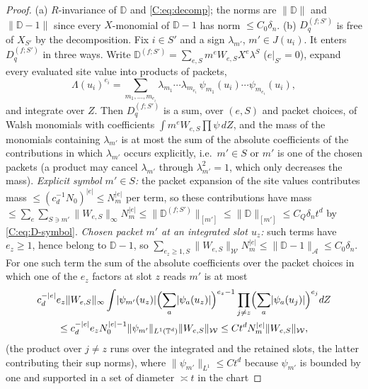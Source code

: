 \documentclass[11pt]{article}
\newcommand{\Torus}{\mathbb{T}}
\newcommand{\cW}{\mathcal{W}}
\newcommand{\cA}{\mathcal{A}}
\newcommand{\norm}[1]{\lVert #1\rVert}
\newcommand{\abs}[1]{\lvert #1\rvert}
\begin{document}
\begin{proof}
(a) \(R\)-invariance of \(\mathbb D\) and \eqref{C:eq:decomp}; the norms are
\(\norm{\mathbb D}\) and \(\norm{\mathbb D-1}\) since every \(X\)-monomial of
\(\mathbb D-1\) has norm \(\le C_0\delta_n\).  (b) \(D_q^{(f;S')}\) is free of \(X_{S'}\) by the decomposition.  Fix
\(i\in S'\) and a sign \(\lambda_{m'}\), \(m'\in J(u_i)\).  It enters
\(D_q^{(f;S')}\) in three ways.  Write
\(\mathbb D^{(f;S')}=\sum_{e,S}m^eW_{e,S}X^e\lambda^S\) (\(e|_{S'}=0\)), expand
every evaluated site value into products of packets,
\[
 \Lambda(u_i)^{e_i}=\sum_{m_1,\dots,m_{e_i}}\lambda_{m_1}\cdots\lambda_{m_{e_i}}\,\psi_{m_1}(u_i)\cdots\psi_{m_{e_i}}(u_i),
\]
and integrate over \(Z\).  Then \(D_q^{(f;S')}\) is a sum, over \((e,S)\) and
packet choices, of Walsh monomials with coefficients
\(\int m^eW_{e,S}\prod\psi\,dZ\), and the mass of the monomials containing
\(\lambda_{m'}\) is at most the sum of the absolute coefficients of the
contributions in which \(\lambda_{m'}\) occurs explicitly, i.e.\ \(m'\in S\)
or \(m'\) is one of the chosen packets (a product may cancel
\(\lambda_{m'}\) through \(\lambda_{m'}^2=1\), which only decreases the mass).
\emph{Explicit symbol \(m'\in S\):} the packet expansion of the site
values contributes mass \(\le(c_d^{-1}N_0)^{\abs e}\le N_m^{\abs e}\) per term, so
these contributions have mass
\(\le\sum_e\sum_{S\ni m'}\norm{W_{e,S}}_\infty N_m^{\abs e}\le\norm{\mathbb D^{(f;S')}}_{[m']}\le\norm{\mathbb D}_{[m']}\le C_Q\delta_nt^d\)
by \eqref{C:eq:D-symbol}.
\emph{Chosen packet \(m'\) at an integrated slot \(u_z\):} such terms have
\(e_z\ge1\), hence belong to \(\mathbb D-1\), so
\(\sum_{e_z\ge1,S}\norm{W_{e,S}}_{\cW}N_m^{\abs e}\le\norm{\mathbb D-1}_\cA\le C_0\delta_n\).
For one such term the sum of the absolute coefficients over the packet
choices in which one of the \(e_z\) factors at slot \(z\) reads \(m'\) is
at most
\begin{multline*}
 c_d^{-\abs e}e_z\norm{W_{e,S}}_\infty\int\abs{\psi_{m'}(u_z)}\Bigl(\sum_{a}\abs{\psi_a(u_z)}\Bigr)^{e_z-1}
 \prod_{j\ne z}\Bigl(\sum_{a}\abs{\psi_a(u_j)}\Bigr)^{e_j}dZ\\
 \le c_d^{-\abs e}e_zN_0^{\abs e-1}\norm{\psi_{m'}}_{L^1(\Torus^d)}\norm{W_{e,S}}_{\cW}
 \le Ct^dN_m^{\abs e}\norm{W_{e,S}}_{\cW},
\end{multline*}
(the product over \(j\ne z\) runs over the integrated and the retained
slots, the latter contributing their sup norms),
where \(\norm{\psi_{m'}}_{L^1}\le Ct^d\) because \(\psi_{m'}\) is bounded by one
and supported in a set of diameter \(\asymp t\) in the chart

\end{proof}
\end{document}
